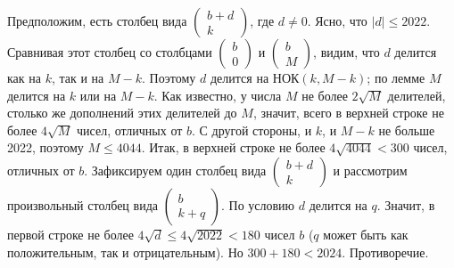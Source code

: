 \documentclass[a4paper,12pt]{article}
\begin{document}
\begin{enumerate}[label=\textbf{Задача \arabic*.}]
Предположим, есть столбец вида $\begin{pmatrix} b+d \\ k \end{pmatrix}$, где $d \neq 0$. Ясно, что $|d| \le 2022$. Сравнивая этот столбец со столбцами $\begin{pmatrix} b \\ 0 \end{pmatrix}$ и $\begin{pmatrix} b \\ M \end{pmatrix}$, видим, что $d$ делится как на $k$, так и на $M-k$.
Поэтому $d$ делится на $\text{НОК}(k, M-k)$; по лемме $M$ делится на $k$ или на $M-k$. Как известно, у числа $M$ не более $2\sqrt{M}$ делителей, столько же дополнений этих делителей до $M$, значит, всего в верхней строке не более $4\sqrt{M}$ чисел, отличных от $b$. С другой стороны, и $k$, и $M-k$ не больше 2022, поэтому $M \le 4044$. Итак, в верхней строке не более $4\sqrt{4044} < 300$ чисел, отличных от $b$. Зафиксируем один столбец вида $\begin{pmatrix} b+d \\ k \end{pmatrix}$ и рассмотрим произвольный столбец вида $\begin{pmatrix} b \\ k+q \end{pmatrix}$. По условию $d$ делится на $q$. Значит, в первой строке не более $4\sqrt{d} \le 4\sqrt{2022} < 180$ чисел $b$ ($q$ может быть как положительным, так и отрицательным). Но $300 + 180 < 2024$. Противоречие.
\end{enumerate}
\end{document}
